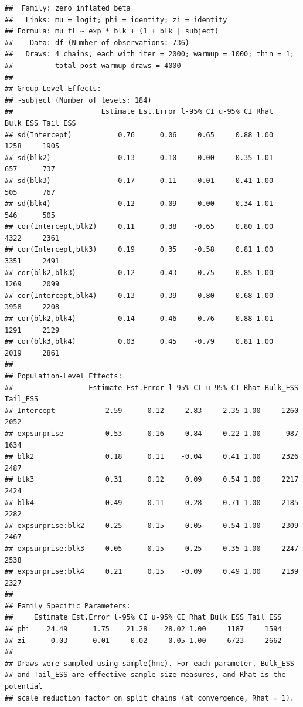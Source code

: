 \documentclass[
]{article}
\begin{document}
\begin{verbatim}
##  Family: zero_inflated_beta 
##   Links: mu = logit; phi = identity; zi = identity 
## Formula: mu_fl ~ exp * blk + (1 + blk | subject) 
##    Data: df (Number of observations: 736) 
##   Draws: 4 chains, each with iter = 2000; warmup = 1000; thin = 1;
##          total post-warmup draws = 4000
## 
## Group-Level Effects: 
## ~subject (Number of levels: 184) 
##                     Estimate Est.Error l-95% CI u-95% CI Rhat Bulk_ESS Tail_ESS
## sd(Intercept)           0.76      0.06     0.65     0.88 1.00     1258     1905
## sd(blk2)                0.13      0.10     0.00     0.35 1.01      657      737
## sd(blk3)                0.17      0.11     0.01     0.41 1.00      505      767
## sd(blk4)                0.12      0.09     0.00     0.34 1.01      546      505
## cor(Intercept,blk2)     0.11      0.38    -0.65     0.80 1.00     4322     2361
## cor(Intercept,blk3)     0.19      0.35    -0.58     0.81 1.00     3351     2491
## cor(blk2,blk3)          0.12      0.43    -0.75     0.85 1.00     1269     2099
## cor(Intercept,blk4)    -0.13      0.39    -0.80     0.68 1.00     3958     2208
## cor(blk2,blk4)          0.14      0.46    -0.76     0.88 1.01     1291     2129
## cor(blk3,blk4)          0.03      0.45    -0.79     0.81 1.00     2019     2861
## 
## Population-Level Effects: 
##                  Estimate Est.Error l-95% CI u-95% CI Rhat Bulk_ESS Tail_ESS
## Intercept           -2.59      0.12    -2.83    -2.35 1.00     1260     2052
## expsurprise         -0.53      0.16    -0.84    -0.22 1.00      987     1634
## blk2                 0.18      0.11    -0.04     0.41 1.00     2326     2487
## blk3                 0.31      0.12     0.09     0.54 1.00     2217     2424
## blk4                 0.49      0.11     0.28     0.71 1.00     2185     2282
## expsurprise:blk2     0.25      0.15    -0.05     0.54 1.00     2309     2467
## expsurprise:blk3     0.05      0.15    -0.25     0.35 1.00     2247     2538
## expsurprise:blk4     0.21      0.15    -0.09     0.49 1.00     2139     2327
## 
## Family Specific Parameters: 
##     Estimate Est.Error l-95% CI u-95% CI Rhat Bulk_ESS Tail_ESS
## phi    24.49      1.75    21.28    28.02 1.00     1187     1594
## zi      0.03      0.01     0.02     0.05 1.00     6723     2662
## 
## Draws were sampled using sample(hmc). For each parameter, Bulk_ESS
## and Tail_ESS are effective sample size measures, and Rhat is the potential
## scale reduction factor on split chains (at convergence, Rhat = 1).
\end{verbatim}
\end{document}
